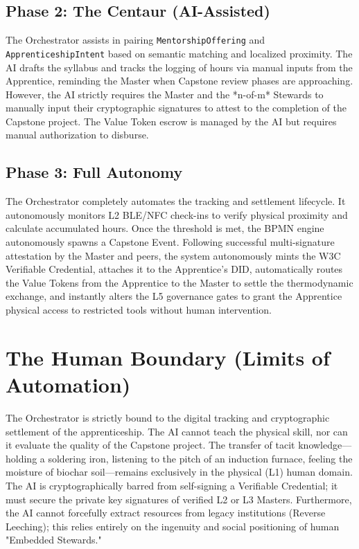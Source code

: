 \subsection{Phase 2: The Centaur (AI-Assisted)}
The Orchestrator assists in pairing \texttt{MentorshipOffering} and \texttt{ApprenticeshipIntent} based on semantic matching and localized proximity. The AI drafts the syllabus and tracks the logging of hours via manual inputs from the Apprentice, reminding the Master when Capstone review phases are approaching. However, the AI strictly requires the Master and the *n-of-m* Stewards to manually input their cryptographic signatures to attest to the completion of the Capstone project. The Value Token escrow is managed by the AI but requires manual authorization to disburse.

\subsection{Phase 3: Full Autonomy}
The Orchestrator completely automates the tracking and settlement lifecycle. It autonomously monitors L2 BLE/NFC check-ins to verify physical proximity and calculate accumulated hours. Once the threshold is met, the BPMN engine autonomously spawns a Capstone Event. Following successful multi-signature attestation by the Master and peers, the system autonomously mints the W3C Verifiable Credential, attaches it to the Apprentice's DID, automatically routes the Value Tokens from the Apprentice to the Master to settle the thermodynamic exchange, and instantly alters the L5 governance gates to grant the Apprentice physical access to restricted tools without human intervention.

\section{The Human Boundary (Limits of Automation)}
The Orchestrator is strictly bound to the digital tracking and cryptographic settlement of the apprenticeship. The AI cannot teach the physical skill, nor can it evaluate the quality of the Capstone project. The transfer of tacit knowledge---holding a soldering iron, listening to the pitch of an induction furnace, feeling the moisture of biochar soil---remains exclusively in the physical (L1) human domain. The AI is cryptographically barred from self-signing a Verifiable Credential; it must secure the private key signatures of verified L2 or L3 Masters. Furthermore, the AI cannot forcefully extract resources from legacy institutions (Reverse Leeching); this relies entirely on the ingenuity and social positioning of human "Embedded Stewards."

